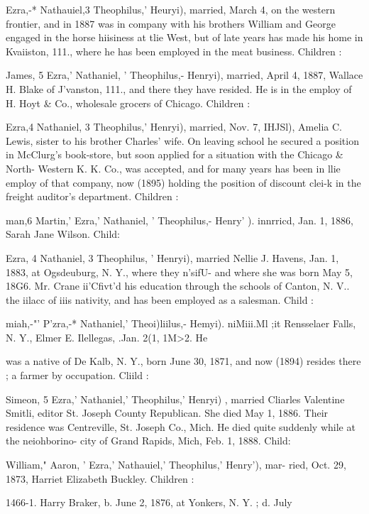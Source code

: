 \documentclass{book}
\begin{document}
Ezra,-* Nathauiel,3 Theophilus,' Heuryi), married, March 4, 
on the western frontier, and in 1887 was in company with his 
brothers William and George engaged in the horse hiisiness at tlie 
West, but of late years has made his home in Kvaiiston, 111., 
where he has been employed in the meat business. Children : 


James, 5 Ezra,' Nathaniel, ' Theophilus,- Henryi), married, April 
4, 1887, Wallace H. Blake of J'vanston, 111., and there they have 
resided. He is in the employ of H. Hoyt \& Co., wholesale 
grocers of Chicago. Children : 



Ezra,4 Nathaniel, 3 Theophilus,' Henryi), married, Nov. 7, IHJSl), 
Amelia C. Lewis, sister to his brother Charles' wife. On leaving 
school he secured a position in McClurg's book-store, but soon 
applied for a situation with the Chicago \& North- Western K. K. 
Co., was accepted, and for many years has been in llie employ of 
that company, now (1895) holding the position of discount clei-k 
in the freight auditor's department. Children : 


man,6 Martin,' Ezra,' Nathaniel, ' Theophilus,- Henry' ). innrricd, 
Jan. 1, 1886, Sarah Jane Wilson. Child: 


Ezra, 4 Nathaniel, 3 Theophilus, ' Henryi), married Nellie J. 
Havens, Jan. 1, 1883, at Ogsdeuburg, N. Y., where they n'sifU- 
and where she was born May 5, 18G6. Mr. Crane ii'Cfivt'd his 
education through the schools of Canton, N. V.. the iilacc of iiis 
nativity, and has been employed as a salesman. Child : 


miah,-"' P'zra,-* Nathaniel,' Theoi)liilus,- Hemyi). niMiii.Ml ;it 
Rensselaer Falls, N. Y., Elmer E. Ilellegas, .Jan. 2(1, 1M>2. He 




was a native of De Kalb, N. Y., born June 30, 1871, and now 
(1894) resides there ; a farmer by occupation. Cliild : 


Simeon, 5 Ezra,' Nathaniel,' Theophilus,' Henryi) , married Cliarles 
Valentine Smitli, editor St. Joseph County Republican. She died 
May 1, 1886. Their residence was Centreville, St. Joseph Co., 
Mich. He died quite suddenly while at the neiohborino- city of 
Grand Rapids, Mich, Feb. 1, 1888. Child: 


William," Aaron, ' Ezra,' Nathauiel,' Theophilus,' Henry'), mar- 
ried, Oct. 29, 1873, Harriet Elizabeth Buckley. Children : 

1466-1. Harry Braker, b. June 2, 1876, at Yonkers, N. Y. ; d. July 
\end{document}
